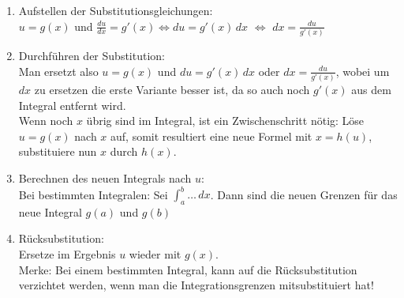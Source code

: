 \begin{enumerate}
	\item Aufstellen der Substitutionsgleichungen:\\
	$u = g(x)$ und $ \frac{du}{dx} = g'(x) \Leftrightarrow du = g'(x) \, dx$ $\Leftrightarrow$ $dx = \frac{du}{g'(x)}$

	\item Durchführen der Substitution:\\
	Man ersetzt also $u = g(x)$ und $du = g'(x) \, dx$ oder $dx = \frac{du}{g'(x)}$, wobei um $dx$ zu ersetzen die erste Variante besser ist, da so auch noch $g'(x)$ aus dem Integral entfernt wird. \\
	Wenn noch $x$ übrig sind im Integral, ist ein Zwischenschritt nötig:
	Löse $u = g(x)$ nach $x$ auf, somit resultiert eine neue Formel mit 
	$x = h(u)$, substituiere nun $x$ durch $h(x)$.

	\item Berechnen des neuen Integrals nach $u$:\\
	Bei bestimmten Integralen: Sei $\int_a^b \ldots \,dx$. Dann sind die neuen
	Grenzen für das neue Integral $g(a)$ und $g(b)$

	\item Rücksubstitution:\\
	Ersetze im Ergebnis $u$ wieder mit $g(x)$. \\
	Merke: Bei einem bestimmten Integral, kann auf die Rücksubstitution verzichtet werden, wenn man die Integrationsgrenzen mitsubstituiert hat!
\end{enumerate}

